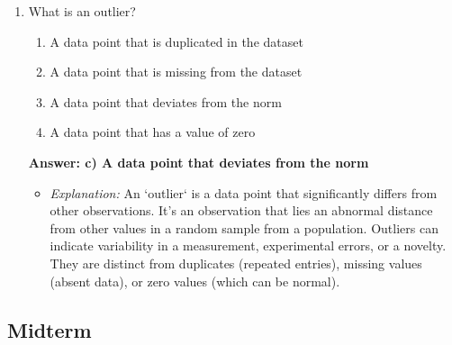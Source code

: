 \documentclass{article}
\begin{document}
\begin{enumerate}[label=\textbf{Question \arabic*.}]
    \item What is an outlier?
        \begin{enumerate}[label=\alph*)]
            \item A data point that is duplicated in the dataset
            \item A data point that is missing from the dataset
            \item A data point that deviates from the norm
            \item A data point that has a value of zero
        \end{enumerate}
        \textbf{Answer: c) A data point that deviates from the norm}
        \begin{itemize}
            \item \textit{Explanation:} An `outlier` is a data point that significantly differs from other observations. It's an observation that lies an abnormal distance from other values in a random sample from a population. Outliers can indicate variability in a measurement, experimental errors, or a novelty. They are distinct from duplicates (repeated entries), missing values (absent data), or zero values (which can be normal).
        \end{itemize}
    
    \end{enumerate}    

\subsection*{Midterm}
\end{document}
